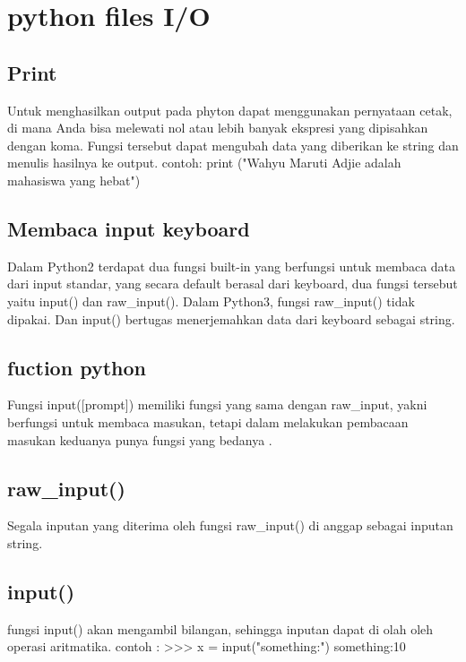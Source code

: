 
\section{python files I/O} 

\subsection{Print}
Untuk menghasilkan output  pada phyton dapat menggunakan pernyataan cetak, di mana Anda bisa melewati nol atau lebih banyak ekspresi yang dipisahkan dengan koma. Fungsi tersebut dapat mengubah data yang diberikan ke string dan menulis hasilnya ke output.
contoh:  print ("Wahyu Maruti Adjie adalah mahasiswa yang hebat")

\subsection{Membaca input keyboard}
Dalam Python2 terdapat  dua fungsi built-in yang berfungsi untuk membaca data dari input standar, yang secara default berasal dari keyboard, dua fungsi tersebut yaitu input() dan raw_input(). Dalam Python3, fungsi raw_input() tidak dipakai. Dan input() bertugas menerjemahkan data dari keyboard sebagai string.

\subsection{fuction python}
Fungsi input([prompt]) memiliki fungsi yang sama dengan raw_input, yakni berfungsi untuk membaca masukan, tetapi dalam melakukan pembacaan masukan keduanya punya fungsi yang bedanya . 

\subsection{raw_input()} 
Segala inputan yang diterima oleh fungsi raw_input() di anggap sebagai inputan string.

\subsection{input()}
 fungsi input() akan mengambil bilangan, sehingga inputan dapat di olah oleh operasi aritmatika.
contoh : >>> x = input("something:")
something:10

